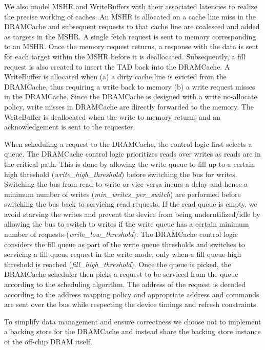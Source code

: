 \par We also model MSHR and WriteBuffers with their associated latencies to realize the precise working of caches. An MSHR is allocated on a cache line miss in the DRAMCache and subsequent requests to that cache line are coalesced and added as targets in the MSHR. A single fetch request is sent to memory corresponding to an MSHR. Once the memory request returns, a response with the data is sent for each target within the MSHR before it is deallocated. Subsequently, a fill request is also created to insert the TAD back into the DRAMCache. 
A WriteBuffer is allocated when (a) a dirty cache line is evicted from the DRAMCache, thus requiring a write back to memory (b) a write request misses in the DRAMCache. Since the DRAMCache is designed with a write no-allocate policy, write misses in DRAMCache are directly forwarded to the memory. The WriteBuffer is deallocated when the write to memory returns and an acknowledgement is sent to the requester. 
\par When scheduling a request to the DRAMCache, the control logic first selects a queue. The DRAMCache control logic prioritizes reads over writes as reads are in the critical path. This is done by allowing the write queue to fill up to a certain high threshold (\textit{write\_high\_threshold}) before switching the bus for writes. Switching the bus from read to write or vice versa incurs a delay and hence a minimum number of writes (\textit{min\_writes\_per\_switch}) are performed before switching the bus back to servicing read requests. If the read queue is empty, we avoid starving the writes and prevent the device from being underutilized/idle by allowing the bus to switch to writes if the write queue has a certain minimum number of requests (\textit{write\_low\_threshold}). The DRAMCache control logic considers the fill queue as part of the write queue thresholds and switches to servicing a fill queue request in the write mode, only when a fill queue high threshold is reached (\textit{fill\_high\_threshold}). Once the queue is picked, the DRAMCache scheduler then picks a request to be serviced from the queue according to the scheduling algorithm. The address of the request is decoded according to the  address mapping policy and appropriate address and commands are sent over the bus while respecting the device timings and refresh constraints.
\par To simplify data management and ensure correctness we choose not to implement a backing store for the DRAMCache and instead share the backing store instance of the off-chip DRAM itself.

